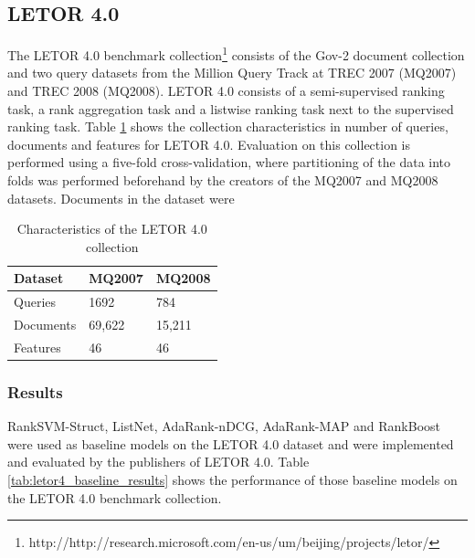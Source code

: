 \subsection{LETOR 4.0}
The LETOR 4.0 benchmark collection\footnote{http://http://research.microsoft.com/en-us/um/beijing/projects/letor/} consists of the Gov-2 document collection and two query datasets from the Million Query Track at \ac{TREC} 2007 (MQ2007) and \ac{TREC} 2008 (MQ2008). LETOR 4.0 consists of a semi-supervised ranking task, a rank aggregation task and a listwise ranking task next to the supervised ranking task. Table \ref{tab:letor4_characteristics} shows the collection characteristics in number of queries, documents and features for LETOR 4.0. Evaluation on this collection is performed using a five-fold cross-validation, where partitioning of the data into folds was performed beforehand by the creators of the MQ2007 and MQ2008 datasets. Documents in the dataset were 

\begin{table}
\begin{tabular}{l|ll}
 Dataset & MQ2007 & MQ2008 \\ 
 \hline
 Queries & 1692 & 784 \\ 
 Documents & 69,622 & 15,211 \\
 Features & 46 & 46 \\
\end{tabular}
\caption{Characteristics of the LETOR 4.0 collection}
\label{tab:letor4_characteristics}
\end{table}
\subsubsection{Results}
Rank\ac{SVM}-Struct, ListNet, AdaRank-\ac{nDCG}, AdaRank-\ac{MAP} and RankBoost were used as baseline models on the LETOR 4.0 dataset and were implemented and evaluated by the publishers of LETOR 4.0. Table \ref{tab:letor4_baseline_results} shows the performance of those baseline models on the LETOR 4.0 benchmark collection.\\


